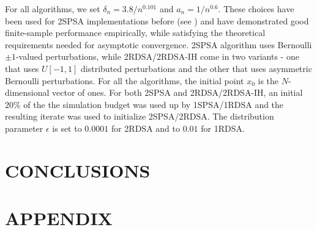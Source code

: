 \documentclass[letterpaper, 10 pt, conference]{ieeeconf}  %
\begin{document}
For all algorithms, we set $\delta_n = 3.8/n^{0.101}$ and $a_n = 1/n^{0.6}$. These choices have been used  for 2SPSA implementations before (see \cite{spall_adaptive}) and have demonstrated good finite-sample performance empirically, while satisfying the theoretical requirements needed for asymptotic convergence. 2SPSA algorithm uses Bernoulli $\pm 1$-valued perturbations, while 2RDSA/2RDSA-IH come in two variants - one that uses $U[-1,1]$ distributed perturbations and the other that uses asymmetric Bernoulli perturbations. For all the algorithms, the initial point $x_0$ is the $N$-dimensional vector of ones.  For both 2SPSA and 2RDSA/2RDSA-IH, an initial $20\%$ of the the simulation budget was used up by 1SPSA/1RDSA and the resulting iterate was used to initialize 2SPSA/2RDSA. The distribution parameter $\epsilon$ is set to $0.0001$ for 2RDSA and to $0.01$ for 1RDSA. 













\section{CONCLUSIONS}


\addtolength{\textheight}{-12cm}   %







\section*{APPENDIX}















\end{document}
